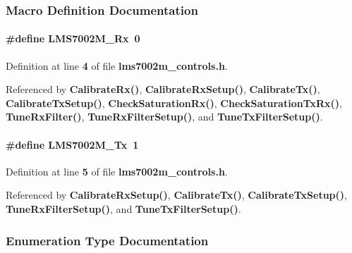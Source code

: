 \subsubsection{Macro Definition Documentation}
\paragraph[{L\+M\+S7002\+M\+\_\+\+Rx}]{\setlength{\rightskip}{0pt plus 5cm}\#define L\+M\+S7002\+M\+\_\+\+Rx~0}\label{lms7002m__controls_8h_ac71a9619d36872c892f18db114040272}


Definition at line {\bf 4} of file {\bf lms7002m\+\_\+controls.\+h}.



Referenced by {\bf Calibrate\+Rx()}, {\bf Calibrate\+Rx\+Setup()}, {\bf Calibrate\+Tx()}, {\bf Calibrate\+Tx\+Setup()}, {\bf Check\+Saturation\+Rx()}, {\bf Check\+Saturation\+Tx\+Rx()}, {\bf Tune\+Rx\+Filter()}, {\bf Tune\+Rx\+Filter\+Setup()}, and {\bf Tune\+Tx\+Filter\+Setup()}.

\paragraph[{L\+M\+S7002\+M\+\_\+\+Tx}]{\setlength{\rightskip}{0pt plus 5cm}\#define L\+M\+S7002\+M\+\_\+\+Tx~1}\label{lms7002m__controls_8h_a67f5282e8119f0b2854225d8eb075a5b}


Definition at line {\bf 5} of file {\bf lms7002m\+\_\+controls.\+h}.



Referenced by {\bf Calibrate\+Rx\+Setup()}, {\bf Calibrate\+Tx()}, {\bf Calibrate\+Tx\+Setup()}, {\bf Tune\+Rx\+Filter\+Setup()}, and {\bf Tune\+Tx\+Filter\+Setup()}.



\subsubsection{Enumeration Type Documentation}
